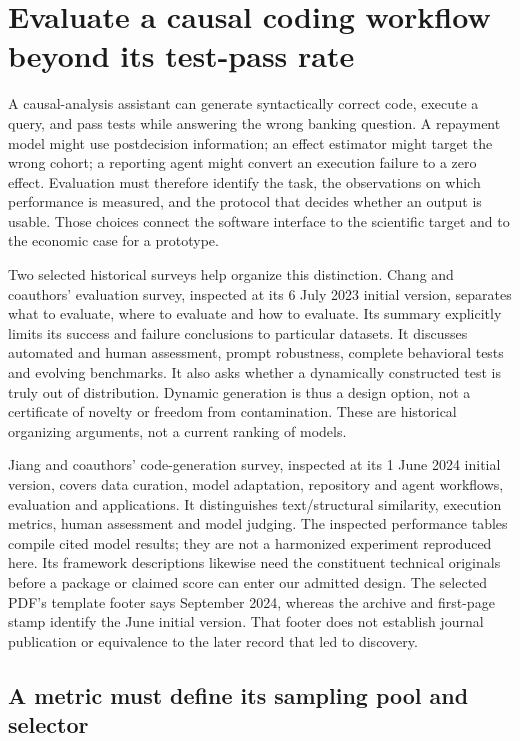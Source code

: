 \section{Evaluate a causal coding workflow beyond its test-pass rate}
\label{exec19:evalcode-scope}

A causal-analysis assistant can generate syntactically correct code, execute a
query, and pass tests while answering the wrong banking question. A repayment
model might use postdecision information; an effect estimator might target the
wrong cohort; a reporting agent might convert an execution failure to a zero
effect. Evaluation must therefore identify the task, the observations on which
performance is measured, and the protocol that decides whether an output is
usable. Those choices connect the software interface to the scientific target
and to the economic case for a prototype.

Two selected historical surveys help organize this distinction. Chang and
coauthors' evaluation survey, inspected at its 6 July 2023 initial version,
separates what to evaluate, where to evaluate and how to evaluate. Its summary
explicitly limits its success and failure conclusions to particular datasets.
It discusses automated and human assessment, prompt robustness, complete
behavioral tests and evolving benchmarks. It also asks whether a dynamically
constructed test is truly out of distribution. Dynamic generation is thus a
design option, not a certificate of novelty or freedom from contamination.
These are historical organizing arguments, not a current ranking of models.
\citep{exec19_surveys_evaluation}

Jiang and coauthors' code-generation survey, inspected at its 1 June 2024
initial version, covers data curation, model adaptation, repository and agent
workflows, evaluation and applications. It distinguishes text/structural
similarity, execution metrics, human assessment and model judging. The inspected
performance tables compile cited model results; they are not a harmonized
experiment reproduced here. Its framework descriptions likewise need the
constituent technical originals before a package or claimed score can enter
our admitted design. The selected PDF's template footer says September 2024,
whereas the archive and first-page stamp identify the June initial version.
That footer does not establish journal publication or equivalence to the later
record that led to discovery.~\citep{exec19_surveys_code}

\subsection{A metric must define its sampling pool and selector}
\label{exec19:evalcode-selection}

